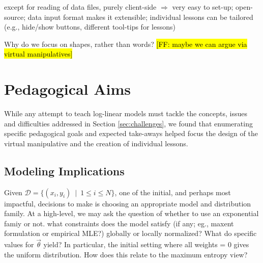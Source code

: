 \documentclass[11pt,letterpaper]{article}
\newcommand{\Note}[1]{}
\renewcommand{\Note}[1]{\hl{[#1]}}
\newcommand{\NoteSigned}[3]{{\sethlcolor{#2}\Note{#1: #3}}}
\newcommand{\NoteFF}[1]{\NoteSigned{FF}{LightBlue}{#1}}
\newcommand{\Data}[0]{\ensuremath{\mathcal{D}}}
\begin{document}
except for reading of data files, purely client-side $\Rightarrow$ very easy to set-up;
open-source;
data input format makes it extensible;
individual lessons can be tailored (e.g., hide/show buttons, different tool-tips for lessons)

Why do we focus on shapes, rather than words? \NoteFF{maybe we can argue via virtual manipulatives}





\section{Pedagogical Aims}\label{sec:aims}
While any attempt to teach log-linear models must tackle the concepts, issues and difficulties 
addressed in Section \ref{sec:challenges}, we found that enumerating specific pedagogical 
goals and expected take-aways helped focus the design of the virtual manipulative and the 
creation of individual lessons. %

\subsection{Modeling Implications}
Given $\Data{} = \{( x_i, y_i)\ \mid\ 1 \le i \le N\}$, one of the initial, and perhaps most impactful, decisions 
to make is choosing an appropriate model and distribution family. At a high-level, we may ask the question of 
whether to use an exponential famiy or not.  what constraints does the model satisfy (if any; eg., maxent formulation or empirical
MLE?) globally or locally normalized?
What do specific values for $\vec{\theta}$ yield? In particular, the initial setting where all weights = 0 gives the uniform distribution. How does this relate to the maximum entropy view? 
\end{document}
